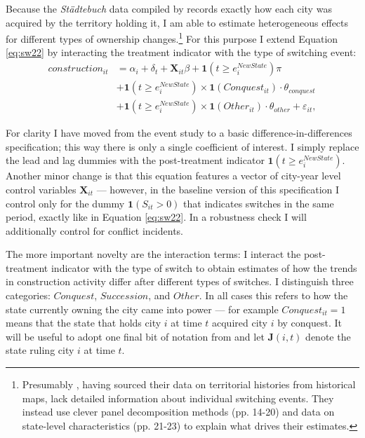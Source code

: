 \documentclass[11pt, a4paper]{article}
\begin{document}
Because the \textit{Städtebuch} data compiled by \cite{pt2} records exactly how each city was acquired by the territory holding it, I am able to estimate heterogeneous effects for different types of ownership changes.\footnote
{
Presumably \cite{schoenholzer2022}, having sourced their data on territorial histories from historical maps, lack detailed information about individual switching events. They instead use clever panel decomposition methods (pp. 14-20) and data on state-level characteristics (pp. 21-23) to explain what drives their estimates.
}
For this purpose I extend Equation \eqref{eq:sw22} by interacting the treatment indicator with the type of switching event:
\begin{equation}
\label{eq:baseline}
\begin{split}
    construction_{it} &= \alpha_i + \delta_t + \mathbf{X}_{it} \beta + 
    \mathbf{1}(t \ge e^{NewState}_i) \pi \\
    &+ \mathbf{1}(t \ge e^{NewState}_i) \times
    \mathbf{1}(Conquest_{it}) \cdot \theta_{conquest} \\
    &+ \mathbf{1}(t \ge e^{NewState}_i) \times
    \mathbf{1}(Other_{it}) \cdot \theta_{other} + \varepsilon_{it},
\end{split}
\end{equation}

For clarity I have moved from the event study to a basic difference-in-differences specification; this way there is only a single coefficient of interest. I simply replace the lead and lag dummies with the post-treatment indicator $\mathbf{1}(t \ge e^{NewState}_i)$. Another minor change is that this equation features a vector of city-year level control variables $\mathbf{X}_{it}$ --- however, in the baseline version of this specification I control only for the dummy $\mathbf{1}(S_{it} > 0)$ that indicates switches in the same period, exactly like in Equation \eqref{eq:sw22}. In a robustness check I will additionally control for conflict incidents.

The more important novelty are the interaction terms: I interact the post-treatment indicator with the type of switch to obtain estimates of how the trends in construction activity differ after different types of switches. I distinguish three categories: $Conquest$, $Succession$, and $Other$. In all cases this refers to how the state currently owning the city came into power --- for example $Conquest_{it} = 1$ means that the state that holds city $i$ at time $t$ acquired city $i$ by conquest. It will be useful to adopt one final bit of notation from \cite{schoenholzer2022} and let $\mathbf{J}(i, t)$ denote the state ruling city $i$ at time $t$.
\end{document}
